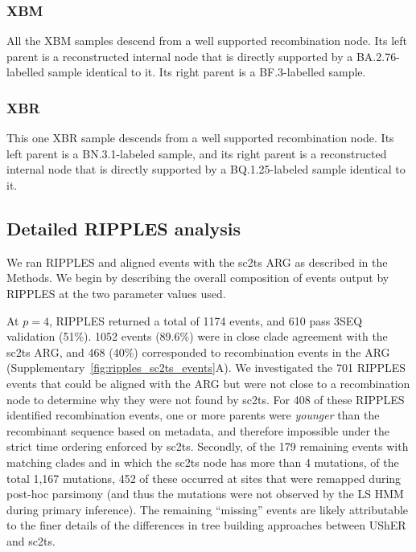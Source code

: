 \documentclass[12pt]{article}
\newcommand{\siref}[1]{Supplementary~\ref{#1}}
\begin{document}



\subsubsection{XBM}
\label{sec:dd_xbm}

All the XBM samples descend from a well supported recombination node.
Its left parent is a reconstructed internal node
that is directly supported by a BA.2.76-labelled sample identical to it.
Its right parent is a BF.3-labelled sample.

\subsubsection{XBR}
\label{sec:dd_xbr}
This one XBR sample descends from a well supported recombination node.
Its left parent is a BN.3.1-labeled sample, and
its right parent is a reconstructed internal node
that is directly supported by a BQ.1.25-labeled sample identical to it.


\subsection{Detailed RIPPLES analysis}
\label{sec:detailed_ripples}
We ran RIPPLES and aligned events with the sc2ts ARG as described in
the Methods. We begin by describing the overall composition of events output
by RIPPLES at the two parameter values used.

At $p=4$, RIPPLES returned a total of 1174 events, and
610 pass 3SEQ validation (51\%). 1052 events
(89.6\%) were in close clade agreement with the sc2ts ARG,
and 468 (40\%) corresponded to recombination events in the ARG
(\siref{fig:ripples_sc2ts_events}A).
We investigated the 701 RIPPLES events that could be aligned
with the ARG but were not close to a recombination node
to determine why they were not found by sc2ts.
For 408 of these RIPPLES identified recombination events,
one or more parents were \emph{younger} than the
recombinant sequence based on metadata,
and therefore impossible under the strict time ordering
enforced by sc2ts.
Secondly, of the 179
remaining events with matching clades and in which the
sc2ts node has more than 4 mutations, of the total
1,167 mutations, 452 of these occurred at sites that were
remapped during post-hoc parsimony (and thus the mutations
were not observed by the LS HMM during primary inference).
The remaining ``missing'' events are likely attributable
to the finer details of the
differences in tree building approaches between UShER and sc2ts.
\end{document}
